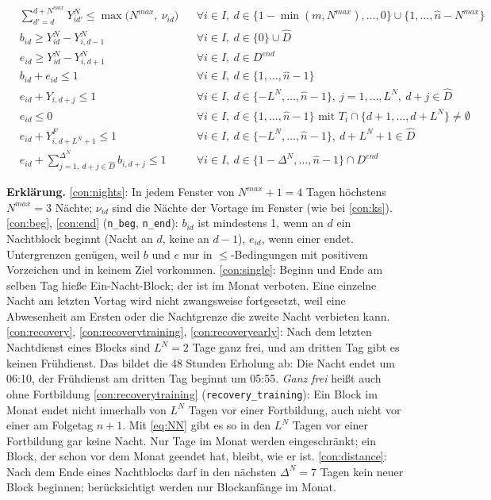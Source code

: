 \documentclass[11pt]{combiArticle}
\newcommand{\code}[1]{\texttt{#1}}
\begin{document}
\begin{align}
  & \textstyle\sum_{d' = d}^{d + N^{max}} Y^{N}_{id'} \le \max\bigl(N^{max},\ \nu_{id}\bigr)
    && \forall i \in I,\ d \in \{1-\min(m,N^{max}),\dots,0\} \cup \{1,\dots,\hat n-N^{max}\} \label{con:nights}\\
  & b_{id} \ge Y^{N}_{id} - Y^{N}_{i,d-1} && \forall i \in I,\ d \in \{0\} \cup \hat D \label{con:beg}\\
  & e_{id} \ge Y^{N}_{id} - Y^{N}_{i,d+1} && \forall i \in I,\ d \in D^{end} \label{con:end}\\
  & b_{id} + e_{id} \le 1 && \forall i \in I,\ d \in \{1,\dots,\hat n-1\} \label{con:single}\\
  & e_{id} + Y_{i,d+j} \le 1 && \forall i \in I,\ d \in \{-L^{N},\dots,\hat n-1\},\ j = 1,\dots,L^{N},\ d+j \in \hat D \label{con:recovery}\\
  & e_{id} \le 0 && \forall i \in I,\ d \in \{1,\dots,\hat n-1\} \text{ mit } T_i \cap \{d+1,\dots,d+L^{N}\} \neq \emptyset
    \label{con:recoverytraining}\\
  & e_{id} + Y^{F}_{i,d+L^{N}+1} \le 1 && \forall i \in I,\ d \in \{-L^{N},\dots,\hat n-1\},\ d+L^{N}+1 \in \hat D \label{con:recoveryearly}\\
  & e_{id} + \textstyle\sum_{j = 1,\ d+j \in \hat D}^{\Delta^{N}} b_{i,d+j} \le 1 && \forall i \in I,\ d \in \{1-\Delta^{N},\dots,\hat n-1\} \cap D^{end} \label{con:distance}
\end{align}

\textbf{Erklärung.}
\eqref{con:nights}: In jedem Fenster von $N^{max}+1 = 4$ Tagen höchstens $N^{max} = 3$ Nächte; $\nu_{id}$ sind
die Nächte der Vortage im Fenster (wie bei \eqref{con:ks}).
\eqref{con:beg}, \eqref{con:end} (\code{n\_beg}, \code{n\_end}): $b_{id}$ ist mindestens 1, wenn an $d$ ein
Nachtblock beginnt (Nacht an $d$, keine an $d-1$), $e_{id}$, wenn einer endet. Untergrenzen genügen, weil $b$
und $e$ nur in $\le$-Bedingungen mit positivem Vorzeichen und in keinem Ziel vorkommen.
\eqref{con:single}: Beginn und Ende am selben Tag hieße Ein-Nacht-Block; der ist im Monat verboten. Eine
einzelne Nacht am letzten Vortag wird nicht zwangsweise fortgesetzt, weil eine Abwesenheit am Ersten oder die
Nachtgrenze die zweite Nacht verbieten kann.
\eqref{con:recovery}, \eqref{con:recoverytraining}, \eqref{con:recoveryearly}: Nach dem letzten Nachtdienst eines
Blocks sind $L^{N} = 2$ Tage ganz frei, und am dritten Tag gibt es keinen Frühdienst. Das bildet die 48 Stunden
Erholung ab: Die Nacht endet um 06:10, der Frühdienst am dritten Tag beginnt um 05:55. \emph{Ganz frei} heißt auch
ohne Fortbildung \eqref{con:recoverytraining} (\code{recovery\_training}): Ein Block im Monat endet nicht innerhalb
von $L^{N}$ Tagen vor einer Fortbildung, auch nicht vor einer am Folgetag $n+1$. Mit \eqref{eq:NN} gibt es so in
den $L^{N}$ Tagen vor einer Fortbildung gar keine Nacht. Nur Tage im Monat werden eingeschränkt; ein Block, der
schon vor dem Monat geendet hat, bleibt, wie er ist.
\eqref{con:distance}: Nach dem Ende eines Nachtblocks darf in den nächsten $\Delta^{N} = 7$ Tagen kein neuer
Block beginnen; berücksichtigt werden nur Blockanfänge im Monat.
\end{document}
